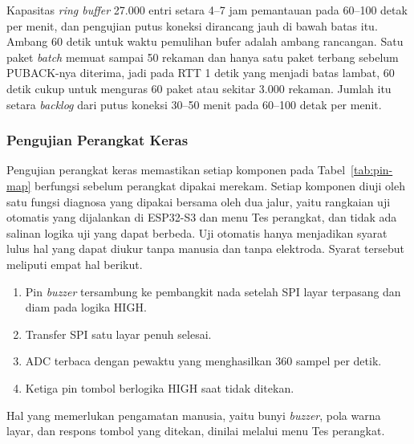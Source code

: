 Kapasitas \textit{ring buffer} 27.000 entri setara 4--7 jam pemantauan pada 60--100 detak per menit, dan pengujian putus koneksi dirancang jauh di bawah batas itu. Ambang 60 detik untuk waktu pemulihan bufer adalah ambang rancangan. Satu paket \textit{batch} memuat sampai 50 rekaman dan hanya satu paket terbang sebelum PUBACK-nya diterima, jadi pada RTT 1 detik yang menjadi batas lambat, 60 detik cukup untuk menguras 60 paket atau sekitar 3.000 rekaman. Jumlah itu setara \textit{backlog} dari putus koneksi 30--50 menit pada 60--100 detak per menit.

\subsubsection{Pengujian Perangkat Keras}

Pengujian perangkat keras memastikan setiap komponen pada Tabel~\ref{tab:pin-map} berfungsi sebelum perangkat dipakai merekam. Setiap komponen diuji oleh satu fungsi diagnosa yang dipakai bersama oleh dua jalur, yaitu rangkaian uji otomatis yang dijalankan di ESP32-S3 dan menu Tes perangkat, dan tidak ada salinan logika uji yang dapat berbeda. Uji otomatis hanya menjadikan syarat lulus hal yang dapat diukur tanpa manusia dan tanpa elektroda. Syarat tersebut meliputi empat hal berikut.
\begin{enumerate}[label=\alph*.]
  \item Pin \textit{buzzer} tersambung ke pembangkit nada setelah SPI layar terpasang dan diam pada logika HIGH.
  \item Transfer SPI satu layar penuh selesai.
  \item ADC terbaca dengan pewaktu yang menghasilkan 360 sampel per detik.
  \item Ketiga pin tombol berlogika HIGH saat tidak ditekan.
\end{enumerate}
Hal yang memerlukan pengamatan manusia, yaitu bunyi \textit{buzzer}, pola warna layar, dan respons tombol yang ditekan, dinilai melalui menu Tes perangkat.

